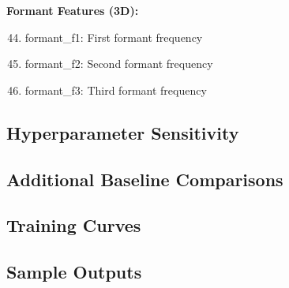 \textbf{Formant Features (3D):}
\begin{enumerate}
    \setcounter{enumi}{43}
    \item formant\_f1: First formant frequency
    \item formant\_f2: Second formant frequency
    \item formant\_f3: Third formant frequency
\end{enumerate}

\subsection{Hyperparameter Sensitivity}


\subsection{Additional Baseline Comparisons}


\subsection{Training Curves}


\subsection{Sample Outputs}

